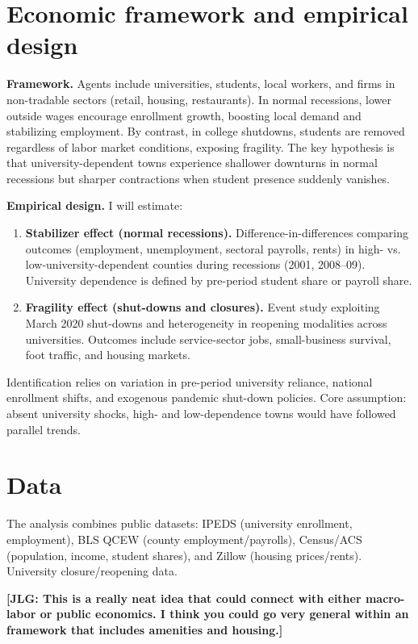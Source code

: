\section{ Economic framework and empirical design}

\noindent \textbf{Framework.} Agents include universities, students, local workers, and firms in non-tradable sectors (retail, housing, restaurants). In normal recessions, lower outside wages encourage enrollment growth, boosting local demand and stabilizing employment. By contrast, in college shutdowns, students are removed regardless of labor market conditions, exposing fragility. The key hypothesis is that university-dependent towns experience shallower downturns in normal recessions but sharper contractions when student presence suddenly vanishes.

\noindent \textbf{Empirical design.} I will estimate:
\begin{enumerate}
	\item \textbf{Stabilizer effect (normal recessions).} Difference-in-differences comparing outcomes (employment, unemployment, sectoral payrolls, rents) in high- vs. low-university-dependent counties during recessions (2001, 2008–09). University dependence is defined by pre-period student share or payroll share.
	\item \textbf{Fragility effect (shut-downs and closures).} Event study exploiting March 2020 shut-downs and heterogeneity in reopening modalities across universities. Outcomes include service-sector jobs, small-business survival, foot traffic, and housing markets.
\end{enumerate}
Identification relies on variation in pre-period university reliance, national enrollment shifts, and exogenous pandemic shut-down policies. Core assumption: absent university shocks, high- and low-dependence towns would have followed parallel trends.

\section{ Data}
\noindent The analysis combines public datasets: IPEDS (university enrollment, employment), BLS QCEW (county employment/payrolls), Census/ACS (population, income, student shares), and Zillow (housing prices/rents). University closure/reopening data.




\bigskip

\noindent \textbf{[JLG: This is a really neat idea that could connect with either macro-labor or public economics. I think you could go very general within an framework that includes amenities and housing.]} 

\singlespacing



\pagebreak
\renewcommand*{\thepage}{A.\arabic{page}}
\setcounter{page}{0}
\setcounter{equation}{0}
\renewcommand{\theequation}{A.\arabic{equation}}
\setcounter{section}{0}
\renewcommand{\thesection}{A.\arabic{section}}
\renewcommand{\thefigure}{A.\arabic{figure}}
\setcounter{figure}{0}
\renewcommand{\thetable}{A.\arabic{table}}
\setcounter{table}{0}
\thispagestyle{empty}



